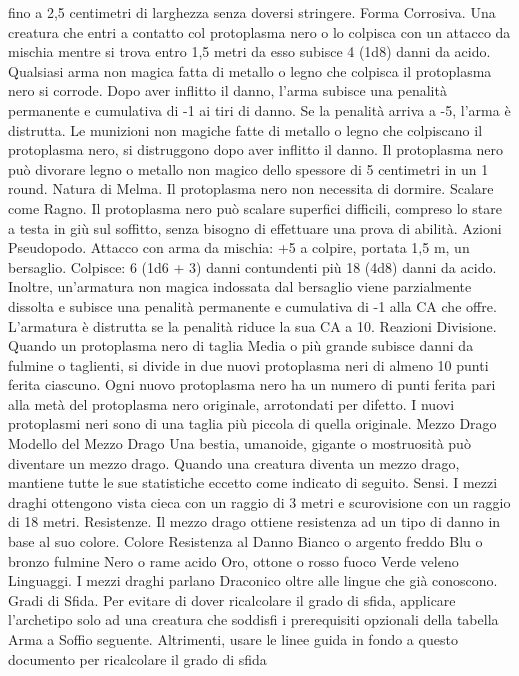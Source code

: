 \begin{multicols}{2}
fino a 2,5 centimetri di larghezza senza doversi stringere.
Forma Corrosiva. Una creatura che entri a contatto col protoplasma
nero o lo colpisca con un attacco da mischia mentre si trova entro 1,5
metri da esso subisce 4 (1d8) danni da acido. Qualsiasi arma non
magica fatta di metallo o legno che colpisca il protoplasma nero si
corrode. Dopo aver inflitto il danno, l’arma subisce una penalità
permanente e cumulativa di -1 ai tiri di danno. Se la penalità arriva a
-5, l’arma è distrutta. Le munizioni non magiche fatte di metallo o
legno che colpiscano il protoplasma nero, si distruggono dopo aver
inflitto il danno.
Il protoplasma nero può divorare legno o metallo non magico dello
spessore di 5 centimetri in un 1 round.
Natura di Melma. Il protoplasma nero non necessita di dormire.
Scalare come Ragno. Il protoplasma nero può scalare superfici
difficili, compreso lo stare a testa in giù sul soffitto, senza
bisogno di effettuare una prova di abilità.
Azioni
Pseudopodo. Attacco con arma da mischia: +5 a colpire, portata
1,5 m, un bersaglio.
Colpisce: 6 (1d6 + 3) danni contundenti più 18 (4d8) danni da
acido. Inoltre, un’armatura non magica indossata dal bersaglio
viene parzialmente dissolta e subisce una penalità permanente e
cumulativa di -1 alla CA che offre. L’armatura è distrutta se la
penalità riduce la sua CA a 10.
Reazioni
Divisione. Quando un protoplasma nero di taglia Media o più grande
subisce danni da fulmine o taglienti, si divide in due nuovi
protoplasma neri di almeno 10 punti ferita ciascuno. Ogni nuovo
protoplasma nero ha un numero di punti ferita pari alla metà del
protoplasma nero originale, arrotondati per difetto. I nuovi
protoplasmi neri sono di una taglia più piccola di quella originale.
Mezzo Drago
Modello del Mezzo Drago
Una bestia, umanoide, gigante o mostruosità può
diventare un mezzo drago. Quando una creatura
diventa un mezzo drago, mantiene tutte le sue
statistiche eccetto come indicato di seguito.
Sensi. I mezzi draghi ottengono vista cieca con un
raggio di 3 metri e scurovisione con un raggio di 18
metri.
Resistenze. Il mezzo drago ottiene resistenza ad un
tipo di danno in base al suo colore.
Colore Resistenza al Danno
Bianco o argento freddo
Blu o bronzo fulmine
Nero o rame acido
Oro, ottone o rosso fuoco
Verde veleno
Linguaggi. I mezzi draghi parlano Draconico oltre alle
lingue che già conoscono.
Gradi di Sfida. Per evitare di dover ricalcolare il grado
di sfida, applicare l’archetipo solo ad una creatura che
soddisfi i prerequisiti opzionali della tabella Arma a
Soffio seguente. Altrimenti, usare le linee guida in fondo
a questo documento per ricalcolare il grado di sfida

\end{multicols}
